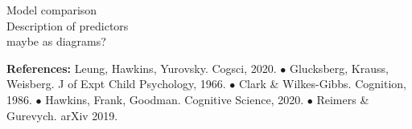 \documentclass[11pt,a4paper]{article}
\begin{document}
\begin{minipage}{\textwidth}
	\begin{small}
		
		
		
		Model comparison\\
		
		Description of predictors \\
		maybe as diagrams?
		
	\end{small} 
	\medskip
\end{minipage}
\begin{minipage}{\textwidth}
	\vspace{5pt}
	\begin{small} \textbf{References:}%
Leung, Hawkins, Yurovsky. Cogsci, 2020. $\bullet$ Glucksberg, Krauss, Weisberg. J of Expt Child Psychology, 1966. $\bullet$ Clark \& Wilkes-Gibbs. Cognition, 1986. $\bullet$ Hawkins, Frank, Goodman. Cognitive Science, 2020. $\bullet$ Reimers \& Gurevych. arXiv 2019.
\end{small}
\end{minipage}
\end{document}
